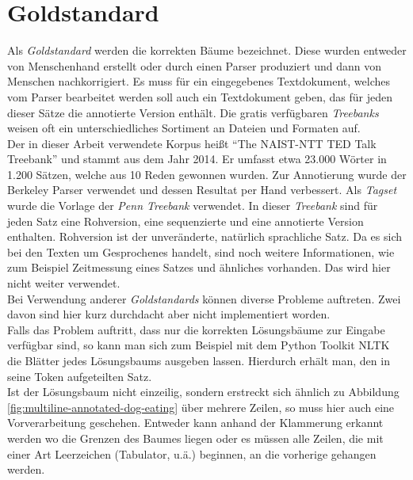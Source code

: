 \section{Goldstandard}
Als \textit{Goldstandard} werden die korrekten Bäume bezeichnet. Diese wurden entweder von Menschenhand erstellt oder durch einen Parser produziert und dann von Menschen nachkorrigiert. Es muss für ein eingegebenes Textdokument, welches vom Parser bearbeitet werden soll auch ein Textdokument geben, das für jeden dieser Sätze die annotierte Version enthält. Die gratis verfügbaren \textit{Treebanks} weisen oft ein unterschiedliches Sortiment an Dateien und Formaten auf.\\
Der in dieser Arbeit verwendete Korpus heißt ``The NAIST-NTT TED Talk Treebank'' \cite{tedtalks} und stammt aus dem Jahr 2014. Er umfasst etwa 23.000 Wörter in 1.200 Sätzen, welche aus 10 Reden gewonnen wurden. Zur Annotierung wurde der Berkeley Parser verwendet und dessen Resultat per Hand verbessert. Als \textit{Tagset} wurde die Vorlage der \textit{Penn Treebank} verwendet. 
In dieser \textit{Treebank} sind für jeden Satz eine Rohversion, eine sequenzierte und eine annotierte Version enthalten. Rohversion ist der unveränderte, natürlich sprachliche Satz. Da es sich bei den Texten um Gesprochenes handelt, sind noch weitere Informationen, wie zum Beispiel Zeitmessung eines Satzes und ähnliches vorhanden. Das wird hier nicht weiter verwendet.\\
Bei Verwendung anderer \textit{Goldstandards} können diverse Probleme auftreten. Zwei davon sind hier kurz durchdacht aber nicht implementiert worden.\\
Falls das Problem auftritt, dass nur die korrekten Lösungsbäume zur Eingabe verfügbar sind, so kann man sich zum Beispiel mit dem Python Toolkit NLTK \cite{nltk} %
die Blätter jedes Lösungsbaums ausgeben lassen. Hierdurch erhält man, den in seine Token aufgeteilten Satz.\\
Ist der Lösungsbaum nicht einzeilig, sondern erstreckt sich ähnlich zu Abbildung \ref{fig:multiline-annotated-dog-eating}  über mehrere Zeilen, so muss hier auch eine Vorverarbeitung geschehen. Entweder kann anhand der Klammerung erkannt werden wo die Grenzen des Baumes liegen oder es müssen alle Zeilen, die mit einer Art Leerzeichen (Tabulator, u.ä.) beginnen, an die vorherige gehangen werden.

